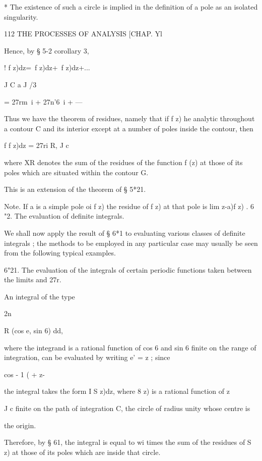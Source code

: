 * The existence of such a circle is implied in the definition of a pole as an isolated 
singularity. 



112 THE PROCESSES OF ANALYSIS [CHAP. Yl 

Hence, by § 5-2 corollary 3, 

! f z)dz=\ f z)dz+\ f z)dz+... 

J C   a J /3 

= 27rm\ i + 27n'6\ i + — 

Thus we have the theorem of residues, namely that if f z) he analytic 
throughout a contour C and its interior except at a number of poles inside the 
contour, then 

f f z)dz = 27ri R, 
J c 

where XR denotes the sum of the residues of the function f (z) at those of its 
poles which are situated within the contour G. 

This is an extension of the theorem of § 5*21. 

Note. If a is a simple pole oi f z) the residue of f z) at that pole is lim   z-a)f z) . 
6 "2. The evaluation of definite integrals. 

We shall now apply the result of § 6*1 to evaluating various classes 
of definite integrals ; the methods to be employed in any particular case may 
usually be seen from the following typical examples. 

6"21. The evaluation of the integrals of certain periodic functions taken 
between the limits and 27r. 



An integral of the type 



2n 



R (cos e, sin 6) dd, 



where the integrand is a rational function of cos 6 and sin 6 finite on the 
range of integration, can be evaluated by writing e'  = z ; since 

cos   - 1 (  + z-%

the integral takes the form I S z)dz, where 8 z) is a rational function of z 

J c 
finite on the path of integration C, the circle of radius unity whose centre is 

the origin. 

Therefore, by § 61, the integral is equal to  wi times the sum of the residues 
of S  z) at those of its poles which are inside that circle. 

